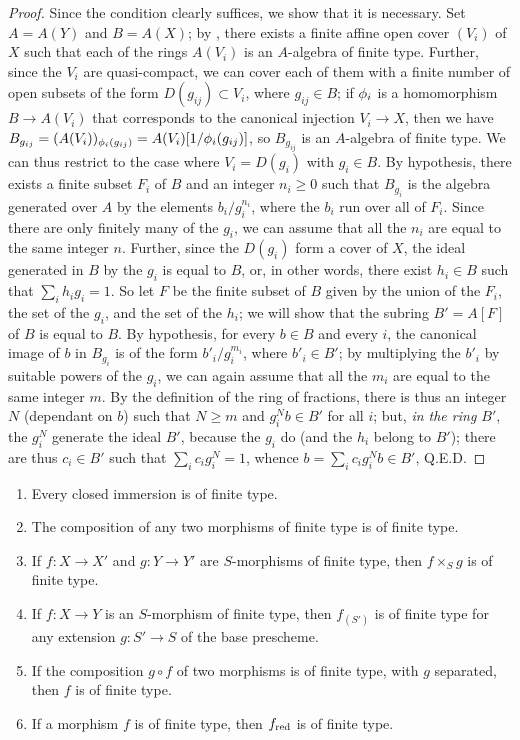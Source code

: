 \begin{proof}
\label{proof-1.6.3.3}
Since the condition clearly suffices, we show that it is necessary.
Set $A=A(Y)$ and $B=A(X)$;
by , there exists a finite affine open cover $(V_i)$ of $X$ such that each of the rings $A(V_i)$ is an $A$-algebra of finite type.
Further, since the $V_i$ are quasi-compact, we can cover each of them with a finite number of open subsets of the form $D(g_{ij})\subset V_i$, where $g_{ij}\in B$;
if $\phi_i$ is a homomorphism $B\to A(V_i)$ that corresponds to the canonical injection $V_i\to X$, then we have $B_{g_{ij}}=(A(V_i))_{\phi_i(g_{ij})}=A(V_i)[1/\phi_i(g_{ij})]$, so $B_{g_{ij}}$ is an $A$-algebra of finite type.
We can thus restrict to the case where $V_i=D(g_i)$ with $g_i\in B$.
By hypothesis, there exists a finite subset $F_i$ of $B$ and an integer $n_i\geq0$ such that $B_{g_i}$ is the algebra generated over $A$ by the elements $b_i/g_i^{n_i}$, where the $b_i$ run over all of $F_i$.
Since there are only finitely many of the $g_i$, we can assume that all the $n_i$ are equal to the same integer $n$.
Further, since the $D(g_i)$ form a cover of $X$, the ideal generated in $B$ by the $g_i$ is equal to $B$, or, in other words, there exist $h_i\in B$ such that $\sum_i h_ig_i=1$.
So let $F$ be the finite subset of $B$ given by the union of the $F_i$, the set of the $g_i$, and the set of the $h_i$; we will show that the subring $B'=A[F]$ of $B$ is equal to $B$.
By hypothesis, for every $b\in B$ and every $i$, the canonical image of $b$ in $B_{g_i}$ is of the form $b'_i/g_i^{m_i}$, where $b'_i\in B'$;
by multiplying the $b'_i$ by suitable powers of the $g_i$, we can again assume that all the $m_i$ are equal to the same integer $m$.
By the definition of the ring of fractions, there is thus an integer $N$ (dependant on $b$) such that $N\geq m$ and $g_i^Nb\in B'$ for all $i$;
but, \emph{in the ring $B'$}, the $g_i^N$ generate the ideal $B'$, because the $g_i$ do (and the $h_i$ belong to $B'$);
there are thus $c_i\in B'$ such that $\sum_i c_ig_i^N=1$, whence $b=\sum_ic_ig_i^Nb\in B'$, Q.E.D.
\end{proof}

\begin{prop}[6.3.4]
\label{1.6.3.4}
\medskip\noindent
\begin{enumerate}[label=\emph{(\roman*)}]
    \item Every closed immersion is of finite type.
    \item The composition of any two morphisms of finite type is of finite type.
    \item If $f:X\to X'$ and $g:Y\to Y'$ are $S$-morphisms of finite type, then $f\times_S g$ is of finite type.
    \item If $f:X\to Y$ is an $S$-morphism of finite type, then $f_{(S')}$ is of finite type for any extension $g:S'\to S$ of the base prescheme.
    \item If the composition $g\circ f$ of two morphisms is of finite type, with $g$ separated, then $f$ is of finite type.
    \item If a morphism $f$ is of finite type, then $f_{\mathrm{red}}$ is of finite type.
\end{enumerate}
\end{prop}

